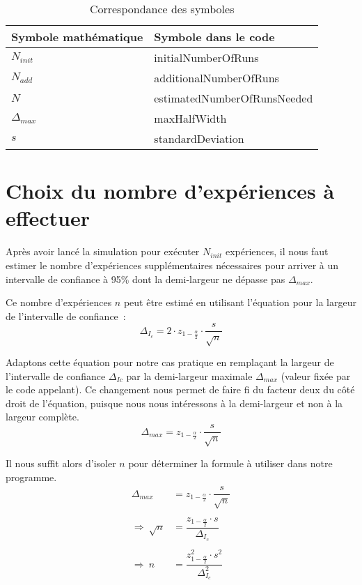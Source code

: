 \documentclass[paper=a4, fontsize=11pt]{scrartcl}
\begin{document}
\begin{table}
  \centering
  \begin{tabular}{|l|l|}
    \hline
    Symbole mathématique & Symbole dans le code \\
    \hline
    $N_{init}$ & initialNumberOfRuns \\
    $N_{add}$ & additionalNumberOfRuns \\
    $N$ & estimatedNumberOfRunsNeeded \\
    $\Delta_{max}$ & maxHalfWidth \\
    $s$ & standardDeviation \\
    \hline
  \end{tabular}
  \caption{Correspondance des symboles}
  \label{table:correspondance}
\end{table}

\section{Choix du nombre d'expériences à effectuer}

Après avoir lancé la simulation pour exécuter $N_{init}$ expériences, il nous faut estimer le nombre d'expériences supplémentaires nécessaires pour arriver à un intervalle de confiance à 95\% dont la demi-largeur ne dépasse pas $\Delta_{max}$.

Ce nombre d'expériences $n$ peut être estimé en utilisant l'équation pour la largeur de l'intervalle de confiance~:
\begin{equation*}
  \Delta_{I_c} = 2\cdot z_{1-\frac{\alpha}{2}}\cdot \dfrac{s}{\sqrt{n}}
\end{equation*}

Adaptons cette équation pour notre cas pratique en remplaçant la largeur de l'intervalle de confiance $\Delta_{Ic}$ par la demi-largeur maximale $\Delta_{max}$ (valeur fixée par le code appelant). Ce changement nous permet de faire fi du facteur deux du côté droit de l'équation, puisque nous nous intéressons à la demi-largeur et non à la largeur complète.
\begin{equation*}
  \Delta_{max} = z_{1-\frac{\alpha}{2}}\cdot \dfrac{s}{\sqrt{n}}
\end{equation*}

Il nous suffit alors d'isoler $n$ pour déterminer la formule à utiliser dans notre programme.
\begin{align*}
  \Delta_{max} &= z_{1-\frac{\alpha}{2}}\cdot \dfrac{s}{\sqrt{n}} \\ \\
  \Rightarrow \ \sqrt{n} &= \dfrac{z_{1-\frac{\alpha}{2}}\cdot s}{\Delta_{I_c}} \\ \\
  \Rightarrow \ n &= \dfrac{z_{1-\frac{\alpha}{2}}^2\cdot s^2}{\Delta_{I_c}^2}
\end{align*}
\end{document}
